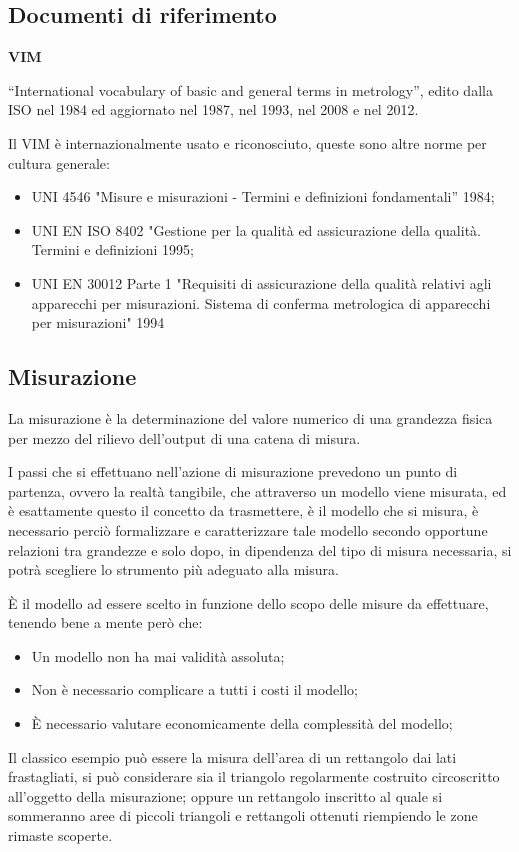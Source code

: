 \documentclass[a4paper, 15pt]{article}
\begin{document}
\subsection{Documenti di riferimento} 
	\begin{adjustwidth}{2in}{}
	\textbf{VIM} 
	
	“International vocabulary of basic and general terms in metrology”, edito
	dalla ISO nel 1984 ed aggiornato nel 1987, nel 1993, nel 2008 e nel 2012. \newline
	
	Il VIM è internazionalmente usato e riconosciuto, queste sono altre norme per cultura generale:
	\begin{itemize}
		\item UNI 4546 "Misure e misurazioni - Termini e definizioni fondamentali” 1984; 
		\item UNI EN ISO 8402 "Gestione per la qualità ed assicurazione della qualità.
		Termini e definizioni 1995;
		\item UNI EN 30012 Parte 1 "Requisiti di assicurazione della qualità relativi agli
		apparecchi per misurazioni. Sistema di conferma metrologica di apparecchi
		per misurazioni" 1994
	\end{itemize}
	\end{adjustwidth}
\newpage 

\subsection{Misurazione} 	
	\begin{adjustwidth}{2in}{}
		La misurazione è la determinazione del valore numerico di una grandezza fisica per mezzo del rilievo dell'output di una catena di misura. 
	
	I passi che si effettuano nell'azione di misurazione prevedono un punto di partenza, ovvero la realtà tangibile, che attraverso un modello viene misurata, ed è esattamente questo il concetto da trasmettere, è il modello che si misura, è necessario perciò formalizzare e caratterizzare tale modello secondo opportune relazioni tra grandezze e solo dopo, in dipendenza del tipo di misura necessaria, si potrà scegliere lo strumento più adeguato alla misura. 
	
	È il modello ad essere scelto in funzione dello scopo delle misure da effettuare, tenendo bene a mente però che: 
	\begin{itemize}
		\item Un modello non ha mai validità assoluta;
		\item Non è necessario complicare a tutti i costi il modello;
		\item È necessario valutare economicamente della complessità del modello;
	\end{itemize}
	Il classico esempio può essere la misura dell'area di un rettangolo dai lati frastagliati, si può considerare sia il triangolo regolarmente costruito circoscritto all'oggetto della misurazione; oppure un rettangolo inscritto al quale si sommeranno aree di piccoli triangoli e rettangoli ottenuti riempiendo le zone rimaste scoperte.	
	\end{adjustwidth}
\end{document}
